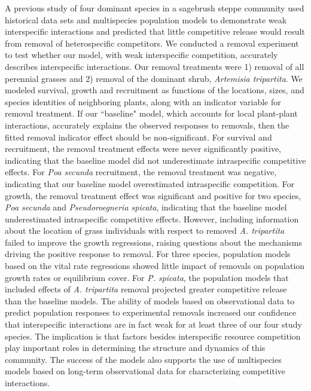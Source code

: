 \documentclass[11pt]{article}
\begin{document}
\begin{doublespacing}
A previous study of four dominant species in a sagebrush steppe community used historical data sets and multispecies population models to demonstrate weak interspecific interactions and predicted that little competitive release would result from removal of heterospecific competitors. We conducted a removal experiment to test whether our model, with weak interspecific competition, accurately describes interspecific interactions. Our removal treatments were 1) removal of all perennial grasses and 2) removal of the dominant shrub, \textit{Artemisia tripartita}. We modeled survival, growth and recruitment as functions of the locations, sizes, and species identities of neighboring plants, along with an indicator variable for removal treatment. If our ``baseline" model, which accounts for local plant-plant interactions, accurately explains the observed responses to removals, then the fitted removal indicator effect should be non-significant. For survival and recruitment, the removal treatment effects were never significantly positive, indicating that the baseline model did not underestimate intraspecific competitive effects. For \textit{Poa secunda} recruitment, the removal treatment was negative, indicating that our baseline model overestimated intraspecific competition. For growth, the removal treatment effect was significant and positive for two species, \textit{Poa secunda} and \textit{Pseudoroegneria spicata}, indicating that the baseline model underestimated intraspecific competitive effects. However, including information about the location of grass individuals with respect to removed \textit{A. tripartita} failed to improve the growth regressions, raising questions about the mechanisms driving the positive response to removal. For three species, population models based on the vital rate regressions showed little impact of removals on population growth rates or equilibrium cover. For \textit{P. spicata}, the population models that included effects of \textit{A. tripartita} removal projected greater competitive release than the baseline models. The ability of models based on observational data to predict population responses to experimental removals increased our confidence that interspecific interactions are in fact weak for at least three of our four study species. The implication is that factors besides interspecific resource competition play important roles in determining the structure and dynamics of this community. The success of the models also supports the use of multispecies models based on long-term observational data for  characterizing competitive interactions. 


\end{doublespacing}
\end{document}
